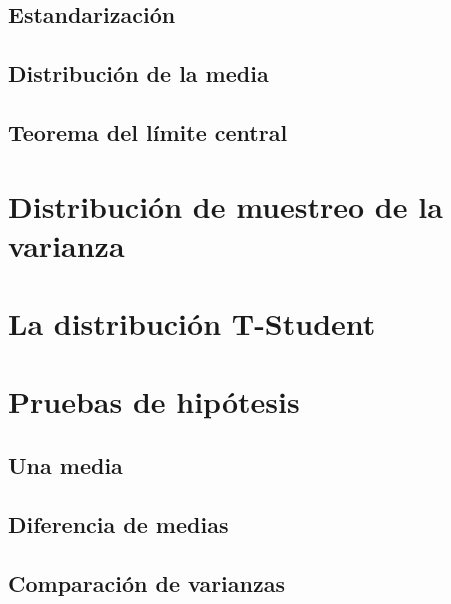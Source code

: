 \documentclass[
]{book}
\begin{document}
\hypertarget{estandarizaciuxf3n}{%
\subsection{Estandarización}\label{estandarizaciuxf3n}}

\hypertarget{distribuciuxf3n-de-la-media}{%
\subsection{Distribución de la media}\label{distribuciuxf3n-de-la-media}}

\hypertarget{teorema-del-luxedmite-central}{%
\subsection{Teorema del límite central}\label{teorema-del-luxedmite-central}}

\hypertarget{distribuciuxf3n-de-muestreo-de-la-varianza}{%
\section{Distribución de muestreo de la varianza}\label{distribuciuxf3n-de-muestreo-de-la-varianza}}

\hypertarget{la-distribuciuxf3n-t-student}{%
\section{La distribución T-Student}\label{la-distribuciuxf3n-t-student}}

\hypertarget{pruebas-de-hipuxf3tesis}{%
\section{Pruebas de hipótesis}\label{pruebas-de-hipuxf3tesis}}

\hypertarget{una-media}{%
\subsection{Una media}\label{una-media}}

\hypertarget{diferencia-de-medias}{%
\subsection{Diferencia de medias}\label{diferencia-de-medias}}

\hypertarget{comparaciuxf3n-de-varianzas}{%
\subsection{Comparación de varianzas}\label{comparaciuxf3n-de-varianzas}}
\end{document}
